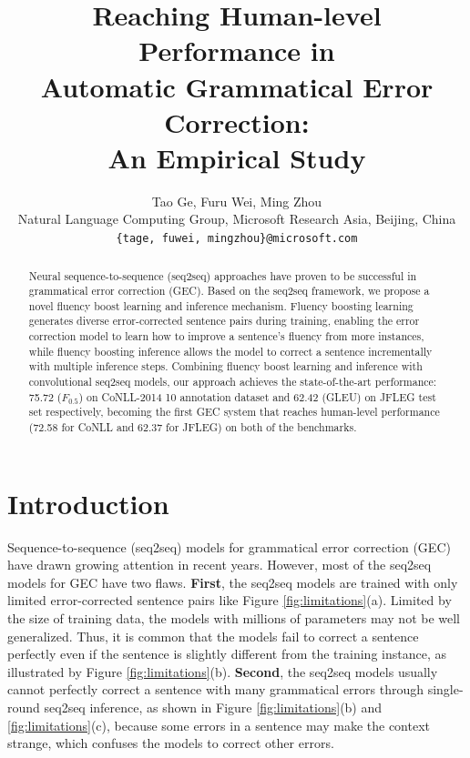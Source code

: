 \documentclass{article} %
\title{Reaching Human-level Performance in \\ Automatic Grammatical Error Correction: \\  An Empirical Study}
\author{Tao Ge, Furu Wei, Ming Zhou \\
Natural Language Computing Group, Microsoft Research Asia, Beijing, China\\
\texttt{\{tage, fuwei, mingzhou\}@microsoft.com}
}
\begin{document}
\maketitle

\begin{abstract}
Neural sequence-to-sequence (seq2seq) approaches have proven to be successful in grammatical error correction (GEC). Based on the seq2seq framework, we propose a novel fluency boost learning and inference mechanism. Fluency boosting learning generates diverse error-corrected sentence pairs during training, enabling the error correction model to learn how to improve a sentence's fluency from more instances, while fluency boosting inference allows the model to correct a sentence incrementally with multiple inference steps. Combining fluency boost learning and inference with convolutional seq2seq models, our approach achieves the state-of-the-art performance: 75.72 ($F_{0.5}$) on CoNLL-2014 10 annotation dataset and 62.42 (GLEU) on JFLEG test set respectively, becoming the first GEC system that reaches human-level performance (72.58 for CoNLL and 62.37 for JFLEG) on both of the benchmarks.
\end{abstract}

\section{Introduction}\label{sec:intro}

Sequence-to-sequence (seq2seq) models \citep{cho-EtAl:2014:EMNLP2014,DBLP:journals/corr/SutskeverVL14} for grammatical error correction (GEC) have drawn growing attention  \citep{yuan2016grammatical,xie2016neural,ji2017nested,schmaltz-EtAl:2017:EMNLP2017,sakaguchi2017grammatical,chollampatt2018,junczys2018approaching} in recent years. However, most of the seq2seq models for GEC have two flaws. \textbf{First}, the seq2seq models are trained with only limited error-corrected sentence pairs like Figure \ref{fig:limitations}(a). Limited by the size of training data, the models with millions of parameters may not be well generalized. Thus, it is common that the models fail to correct a sentence perfectly even if the sentence is slightly different from the training instance, as illustrated by Figure \ref{fig:limitations}(b). \textbf{Second}, the seq2seq models usually cannot perfectly correct a sentence with many grammatical errors through single-round seq2seq inference, as shown in Figure \ref{fig:limitations}(b) and \ref{fig:limitations}(c), because some errors in a sentence may make the context strange, which confuses the models to correct other errors. %
\end{document}
